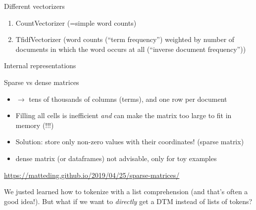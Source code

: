 \documentclass[handout]{beamer}
\begin{document}
\begin{frame}{Different vectorizers}
	\begin{enumerate}[<+->]
		\item CountVectorizer (=simple word counts)
		\item TfidfVectorizer (word counts (``term frequency'') weighted by number of documents in which the word occurs at all (``inverse document frequency''))
	\end{enumerate}
\end{frame}

\begin{frame}{Internal representations}
	\begin{block}{Sparse vs dense matrices}
		\begin{itemize}
			\item $\rightarrow$ tens of thousands of columns (terms), and one row per document
			\item Filling all cells is inefficient \emph{and} can make the matrix too large to fit in memory (!!!)
			\item Solution: store only non-zero values with their coordinates! (sparse matrix)
			\item dense matrix (or dataframes) not advisable, only for toy examples
		\end{itemize}
	\end{block}
\end{frame}


{
	\begin{frame}
		\url{https://matteding.github.io/2019/04/25/sparse-matrices/}
	\end{frame}
}


\begin{frame}[standout]
We justed learned how to tokenize with a list comprehension (and that's often a good idea!). But what if we want to \emph{directly} get a DTM instead of lists of tokens?
\end{frame}
\end{document}
